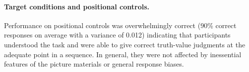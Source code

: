 \documentclass[fleqn,reqno,10pt,draft]{article}
\newcommand{\as}{\acro{as}}
\renewcommand{\es}{\acro{es}}
\begin{document}
\paragraph{Target conditions and positional controls.}
Performance on positional controls was overwhelmingly correct (90\%
correct responses on average with a variance of 0.012) indicating that
participants understood the task and were able to give correct
truth-value judgments at the adequate point in a sequence. In
general, they were not affected by inessential features of the picture
materials or general response biases.




%
\end{document}
